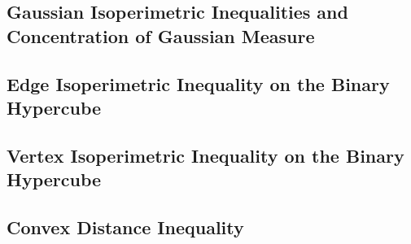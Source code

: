 \documentclass[11pt]{article}
\begin{document}
\subsection{Gaussian Isoperimetric Inequalities and  Concentration of Gaussian Measure}
\subsection{Edge Isoperimetric Inequality on the Binary Hypercube}
\subsection{Vertex Isoperimetric Inequality on the Binary Hypercube}
\subsection{Convex Distance Inequality}








\newpage


\end{document}
